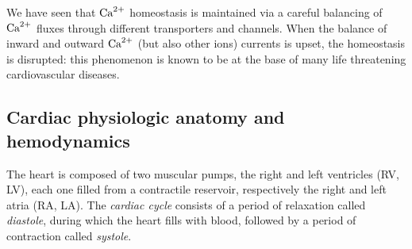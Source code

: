 \vspace{0.2cm}
We have seen that $\textrm{Ca}^{2+}$ homeostasis is maintained via a careful balancing of $\textrm{Ca}^{2+}$ fluxes through different transporters and channels.
When the balance of inward and outward $\textrm{Ca}^{2+}$ (but also other ions) currents is upset, the homeostasis is disrupted: this phenomenon is known to be at the base of many life threatening cardiovascular diseases.


%
%
%
\subsection{Cardiac physiologic anatomy and hemodynamics}
The heart is composed of two muscular pumps, the right and left ventricles (\acs{RV}, \acs{LV}), each one filled from a contractile reservoir, respectively the right and left atria (\acs{RA}, \acs{LA}). The \textit{cardiac cycle} consists of a period of relaxation called \textit{diastole}, during which the heart fills with blood, followed by a period of contraction called \textit{systole}.


